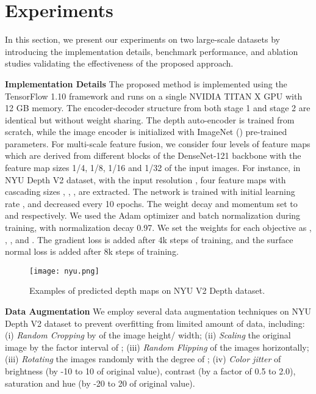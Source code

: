 \documentclass[letterpaper]{article} \usepackage{aaai20}  \usepackage{times}  \usepackage{helvet} \usepackage{courier}  \usepackage{graphicx} \frenchspacing  \setlength{\pdfpagewidth}{8.5in}  \setlength{\pdfpageheight}{11in}  \usepackage{epsfig}
\begin{document}
    \section{Experiments}
    \label{sec:experiments}
    In this section, we present our experiments on two large-scale datasets by introducing the implementation details, benchmark performance, and ablation studies validating the effectiveness of the proposed approach.
 
    \textbf{Implementation Details} \hspace{0.3cm} The proposed method is implemented using the TensorFlow 1.10 framework and runs on a single NVIDIA TITAN X GPU with 12 GB memory. The encoder-decoder structure from both stage 1 and stage 2 are identical but without weight sharing. The depth auto-encoder is trained from scratch, while the image encoder is initialized with ImageNet (\cite{Olga2015ImageNet}) pre-trained parameters. For multi-scale feature fusion, we consider four levels of feature maps which are derived from different blocks of the DenseNet-121 backbone with the feature map sizes 1/4, 1/8, 1/16 and 1/32 of the input images. For instance, in NYU Depth V2 dataset, with the input resolution , four feature maps with cascading sizes , , ,  are extracted.
    The network is trained with initial learning rate , and decreased every 10 epochs. The weight decay and momentum set to  and  respectively. We used the Adam optimizer and batch normalization during training, with normalization decay 0.97. We set the weights for each objective as , , , and . The gradient loss is added after 4k steps of training, and the surface normal loss is added after 8k steps of training.  
    \begin{figure*}[t]
    \begin{center}
    \texttt{[image: nyu.png]}
    \end{center}
    \vspace{-15pt}
       \caption{Examples of predicted depth maps on NYU V2 Depth dataset.}
       \vspace{-8pt}
    \label{fig:NYU Depth V2}
    \end{figure*}
    
    \textbf{Data Augmentation} \hspace{0.3cm} We employ several data augmentation techniques on NYU Depth V2 dataset to prevent overfitting from limited amount of data, including: (i) \textit{Random Cropping} by  of the image height/ width; (ii) \textit{Scaling} the original image by the factor interval of ; (iii) 
    \textit{Random Flipping}  of the images horizontally; (iii) \textit{Rotating} the images randomly with the degree of ; (iv) \textit{Color jitter} of brightness (by -10 to 10 of original value), contrast (by a factor of 0.5 to 2.0), saturation and hue (by -20 to 20 of original value). 
    
\end{document}
